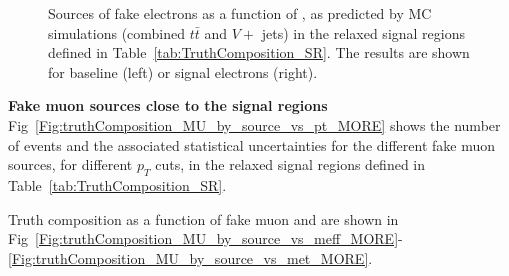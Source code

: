 \begin{figure}[p]
\centering
{}
\caption
{Sources of fake electrons as a function of \met, as predicted by MC simulations (combined $t\bar t$ and $V+$ jets) 
in the relaxed signal regions defined in Table~\ref{tab:TruthComposition_SR}. The results are shown for baseline (left) or signal electrons (right).}
\label{Fig:truthComposition_EL_by_source_vs_met_MORE}
\end{figure} 


	
	
	
	
\par{\bf Fake muon sources close to the signal regions \\}
Fig~\ref{Fig:truthComposition_MU_by_source_vs_pt_MORE} shows the number of events and the associated statistical uncertainties for the different fake muon sources, for different $p_T$ cuts, in the relaxed signal regions defined in Table~\ref{tab:TruthComposition_SR}. 

Truth composition as a function of fake muon \meff and \met are shown in Fig~\ref{Fig:truthComposition_MU_by_source_vs_meff_MORE}-\ref{Fig:truthComposition_MU_by_source_vs_met_MORE}.

